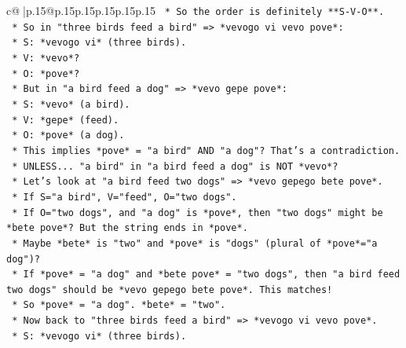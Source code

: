 \documentclass{article}
\begin{document}
{\begin{supertabular}{c@{$\;$}|p{.15\linewidth}@{}p{.15\linewidth}p{.15\linewidth}p{.15\linewidth}p{.15\linewidth}p{.15\linewidth}}
{{{\texttt{                                    *   So the order is definitely **S{-}V{-}O**.} \\
\texttt{                                    *   So in "three birds feed a bird" => *vevogo vi vevo pove*:} \\
\texttt{                                        *   S: *vevogo vi* (three birds).} \\
\texttt{                                        *   V: *vevo*?} \\
\texttt{                                        *   O: *pove*?} \\
\texttt{                                    *   But in "a bird feed a dog" => *vevo gepe pove*:} \\
\texttt{                                        *   S: *vevo* (a bird).} \\
\texttt{                                        *   V: *gepe* (feed).} \\
\texttt{                                        *   O: *pove* (a dog).} \\
\texttt{                                    *   This implies *pove* = "a bird" AND "a dog"? That's a contradiction.} \\
\texttt{                                    *   UNLESS... "a bird" in "a bird feed a dog" is NOT *vevo*?} \\
\texttt{                                    *   Let's look at "a bird feed two dogs" => *vevo gepego bete pove*.} \\
\texttt{                                        *   If S="a bird", V="feed", O="two dogs".} \\
\texttt{                                        *   If O="two dogs", and "a dog" is *pove*, then "two dogs" might be *bete pove*? But the string ends in *pove*.} \\
\texttt{                                        *   Maybe *bete* is "two" and *pove* is "dogs" (plural of *pove*="a dog")?} \\
\texttt{                                        *   If *pove* = "a dog" and *bete pove* = "two dogs", then "a bird feed two dogs" should be *vevo gepego bete pove*. This matches!} \\
\texttt{                                        *   So *pove* = "a dog". *bete* = "two".} \\
\texttt{                                        *   Now back to "three birds feed a bird" => *vevogo vi vevo pove*.} \\
\texttt{                                            *   S: *vevogo vi* (three birds).} \\
}}}
\end{supertabular}}
\end{document}
